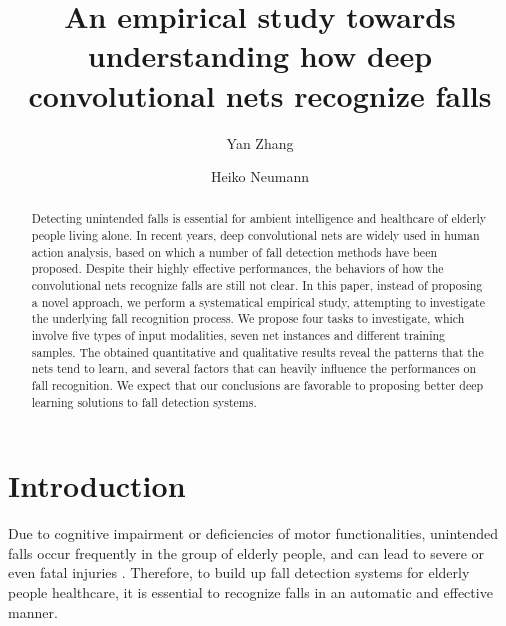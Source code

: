 \documentclass[runningheads]{llncs}
\begin{document}
\title{An empirical study towards understanding how deep convolutional nets recognize falls} 

\author{Yan Zhang \and
Heiko Neumann}

\maketitle              %
\begin{abstract}
Detecting unintended falls is essential for ambient intelligence and healthcare of elderly people living alone. In recent years, deep convolutional nets are widely used in human action analysis, based on which a number of fall detection methods have been proposed. Despite their highly effective performances, the behaviors of how the convolutional nets recognize falls are still not clear. In this paper, instead of proposing a novel approach, we perform a systematical empirical study, attempting to investigate the underlying fall recognition process. We propose four tasks to investigate, which involve five types of input modalities, seven net instances and different training samples. The obtained quantitative and qualitative results reveal the patterns that the nets tend to learn, and several factors that can heavily influence the performances on fall recognition. We expect that our conclusions are favorable to proposing better deep learning solutions to fall detection systems.

\end{abstract}


\section{Introduction}
Due to cognitive impairment or deficiencies of motor functionalities, unintended falls occur frequently in the group of elderly people, and can lead to severe or even fatal injuries \cite{dykes2010fall} \cite{gillain2014falls}. Therefore, to build up fall detection systems for elderly people healthcare, it is essential to recognize falls in an automatic and effective manner. 
\end{document}
